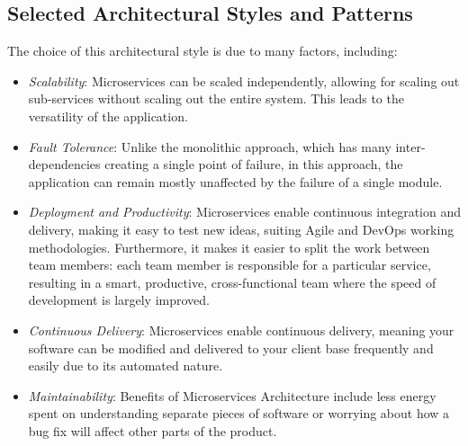\subsection{Selected Architectural Styles and Patterns}

The choice of this architectural style is due to many factors, including:

\begin{itemize}
	\item \textit{Scalability}: Microservices can be scaled independently, allowing for scaling out sub-services without scaling out the entire system. This leads to the versatility of the application.
	
	\item \textit{Fault Tolerance}: Unlike the monolithic approach, which has many inter-dependencies creating a single point of failure, in this approach, the application can remain mostly unaffected by the failure of a single module.
	
	\item \textit{Deployment and Productivity}: Microservices enable continuous integration and delivery, making it easy to test new ideas, suiting Agile and DevOps working methodologies. Furthermore, it makes it easier to split the work between team members: each team member is responsible for a particular service, resulting in a smart, productive, cross-functional team where the speed of development is largely improved.
	
	\item \textit{Continuous Delivery}: Microservices enable continuous delivery, meaning your software can be modified and delivered to your client base frequently and easily due to its automated nature.
	
	\item \textit{Maintainability}: Benefits of Microservices Architecture include less energy spent on understanding separate pieces of software or worrying about how a bug fix will affect other parts of the product.
\end{itemize}
